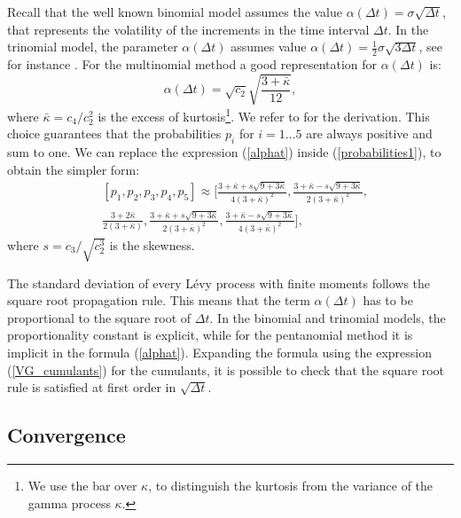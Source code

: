 Recall that the well known binomial model \cite{CRR79} assumes the value $\alpha(\Delta t) = \sigma \sqrt{\Delta t}$,
that represents the volatility of the increments in the time interval $\Delta t$.
In the trinomial model, the parameter $\alpha(\Delta t)$ assumes value $\alpha(\Delta t) = \frac{1}{2} \sigma \sqrt{3\Delta t}$, see for instance \cite{YaPr01}.
For the multinomial method a good representation for $\alpha(\Delta t)$ is:
\begin{equation}\label{alphat}
 \alpha(\Delta t) = \sqrt{c_2} \sqrt{\frac{3+\bar \kappa}{12}},
\end{equation}
where $\bar \kappa = c_4 / c_2^2$ is the excess of kurtosis\footnote{We use the bar over $\kappa$, 
to distinguish the kurtosis from the variance of the gamma process $\kappa$.}. 
We refer to \cite{YaPr06} for the derivation.
This choice guarantees that the probabilities $p_i$ for $i=1...5$ are always positive and sum to one. We can replace the expression
(\ref{alphat}) inside (\ref{probabilities1}), to obtain the simpler form:
\begin{align}\label{probabilities2}
 & [p_1,p_2,p_3,p_4,p_5] \approx \biggl[ \frac{3+\bar \kappa+s\sqrt{9+3\bar \kappa}}{4(3+\bar \kappa)^2} , 
 \frac{3+\bar \kappa-s\sqrt{9+3\bar \kappa}}{2(3+\bar \kappa)^2} , \\ \nonumber
 &
 \frac{3+2\bar \kappa}{2(3+\bar \kappa)} ,
 \frac{3+\bar \kappa+s\sqrt{9+3\bar \kappa}}{2(3+\bar \kappa)^2} ,
 \frac{3+\bar \kappa-s\sqrt{9+3\bar \kappa}}{4(3+\bar \kappa)^2} \biggr],
\end{align}
where $s = c_3 / \sqrt{c_2^3}$ is the skewness.
\begin{Remark}
 The standard deviation of every L\'{e}vy process with finite moments follows the square root propagation rule. This means that the term $\alpha(\Delta t)$ has to be proportional
 to the square root of $\Delta t$. In the binomial and trinomial models, the proportionality constant is explicit, while for the pentanomial method it is implicit
 in the formula (\ref{alphat}). Expanding the formula using the expression (\ref{VG_cumulants}) for the cumulants, it is possible to check that the square root rule is
 satisfied at first order in $\sqrt{\Delta t}$.
\end{Remark}



\subsection{Convergence}


